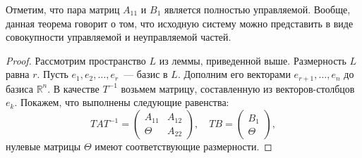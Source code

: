 \begin{note}
  Отметим, что пара матриц $A_{11}$ и $B_1$ является полностью управляемой.
  Вообще, данная теорема говорит о том, что исходную систему можно представить в виде совокупности
  управляемой и неуправляемой частей.
\end{note}

\begin{proof}
  Рассмотрим пространство $L$ из леммы, приведенной выше. Размерность $L$ равна $r$.
  Пусть $e_1, e_2, \ldots, e_r$~--- базис в $L$. Дополним его векторами $e_{r + 1}, \ldots, e_n$
  до базиса $\mathbb{R}^n$. В качестве $T^{-1}$ возьмем матрицу, составленную из векторов-столбцов $e_k$.
  Покажем, что выполнены следующие равенства:
  \begin{equation*}
    T A T^{-1} =
    \begin{pmatrix}
      A_{11} & A_{12}\\
      \Theta & A_{22}
    \end{pmatrix},
    \quad
    T B =
    \begin{pmatrix}
      B_{1}\\
      \Theta
    \end{pmatrix},
  \end{equation*}
  нулевые матрицы $\Theta$ имеют соответствующие размерности.
\end{proof}